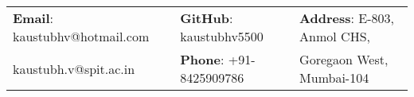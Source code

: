 \documentclass[letterpaper, 11pt]{article}
\begin{document}


\vspace{0.5cm} 
\begin{center}
\begin{tabular}{lll}
\textbf{Email}: kaustubhv@hotmail.com      &
\hspace{0.55in} \textbf{GitHub}: kaustubhv5500    &
\hspace{0.4in} 	\textbf{Address}: E-803, Anmol CHS,  \\

\hspace{0.45in} kaustubh.v@spit.ac.in      &
\hspace{0.55in} \textbf{Phone}: +91-8425909786   & 
\hspace{0.4in} Goregaon West, Mumbai-104
\end{tabular}
\end{center}


\setlength{\tabcolsep}{8pt}
\end{document}
